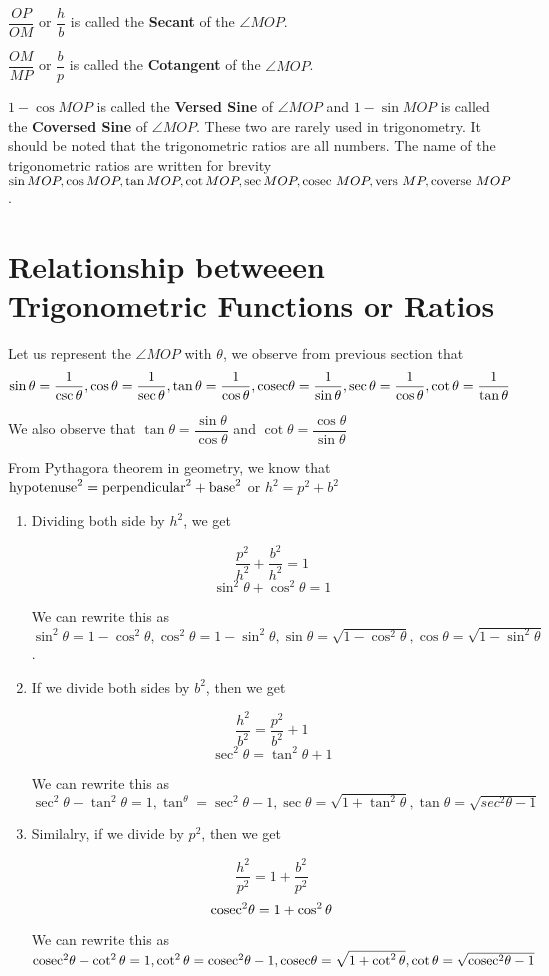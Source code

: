 $\dfrac{OP}{OM}$ or $\dfrac{h}{b}$ is called the {\bf Secant} of the $\angle MOP$.

$\dfrac{OM}{MP}$ or $\dfrac{b}{p}$ is called the {\bf Cotangent} of the $\angle MOP$.

$1 - \cos MOP$ is called the {\bf Versed Sine} of $\angle MOP$ and $1 - \sin MOP$ is called the {\bf Coversed Sine} of $\angle
MOP$. These two are rarely used in trigonometry. It should be noted that the trigonometric ratios are all numbers. The name of the
trigonometric ratios are written for brevity $\sin MOP, \cos MOP, \tan MOP, \cot MOP, \sec MOP, {\rm cosec}~MOP, {\rm vers}~MP,
{\rm coverse}~MOP$.

\section{Relationship betweeen Trigonometric Functions or Ratios}
Let us represent the $\angle MOP$ with $\theta$, we observe from previous section that
$$\sin\theta = \dfrac{1}{\csc\theta}, \cos\theta = \frac{1}{\sec\theta}, \tan\theta =
\frac{1}{\cos\theta}, {\rm cosec}\theta = \frac{1}{\sin\theta}, \sec\theta = \frac{1}{\cos\theta}, \cot\theta =
\frac{1}{\tan\theta}$$

We also observe that $\tan\theta = \dfrac{\sin\theta}{\cos\theta}$ and $\cot\theta = \dfrac{\cos\theta}{\sin\theta}$

From Pythagora theorem in geometry, we know that ${\rm hypotenuse}^2 = {\rm perpendicular}^2 + {\rm base}^2$ or $h^2 = p^2 + b^2$

\begin{enumerate}
\item Dividing both side by $h^2$, we get

$$ \dfrac{p^2}{h^2} + \dfrac{b^2}{h^2} = 1$$
$$ \sin^2\theta + \cos^2\theta = 1$$

We can rewrite this as $\sin^2\theta = 1 - \cos^2\theta, \cos^2\theta = 1 - \sin^2\theta, \sin\theta = \sqrt{1 - \cos^2\theta},
\cos\theta = \sqrt{1 - \sin^2\theta}$.

\item If we divide both sides by $b^2$, then we get

$$ \frac{h^2}{b^2} = \frac{p^2}{b^2} + 1 $$
$$ \sec^2\theta = \tan^2\theta + 1$$

We can rewrite this as $\sec^2\theta - \tan^2\theta = 1, \tan^\theta = \sec^2\theta - 1, \sec\theta = \sqrt{1 + \tan^2\theta},
\tan\theta = \sqrt{sec^2\theta - 1}$

\item Similalry, if we divide by $p^2$, then we get

$$ \frac{h^2}{p^2} = 1 + \frac{b^2}{p^2}$$
$$ {\rm cosec}^2\theta = 1 + \cos^2\theta$$

We can rewrite this as ${\rm cosec}^2\theta - \cot^2\theta = 1, \cot^2\theta = {\rm cosec}^2\theta - 1, {\rm cosec}\theta = \sqrt{1 +
\cot^2\theta}, \cot\theta = \sqrt{{\rm cosec}^2\theta - 1}$
\end{enumerate}


